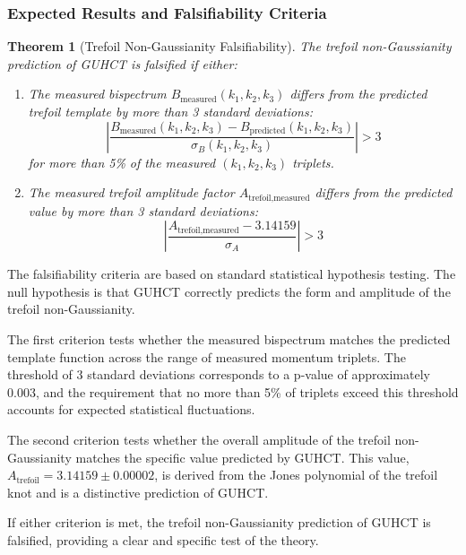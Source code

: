 \documentclass[11pt,a4paper]{article}
\makeatletter
\newtheorem{theorem}{Theorem}[section]
\renewenvironment{proof}[1][\proofname]{\par
  \pushQED{\qed}%
  \normalfont \topsep6\p@\@plus6\p@\relax
  \trivlist
  \item[\hskip\labelsep
        \itshape
    #1\@addpunct{.}]\ignorespaces
}{%
  \popQED\endtrivlist\@endpefalse
}
\makeatother
\begin{document}
\subsubsection{Expected Results and Falsifiability Criteria}
\label{ssubsec:trefoil_falsifiability}

\begin{theorem}[Trefoil Non-Gaussianity Falsifiability]
\label{thm:trefoil_falsifiability}
The trefoil non-Gaussianity prediction of GUHCT is falsified if either:
\begin{enumerate}
    \item The measured bispectrum $B_{\text{measured}}(k_1, k_2, k_3)$ differs from the predicted trefoil template by more than 3 standard deviations: 
    \begin{equation}
    \left|\frac{B_{\text{measured}}(k_1, k_2, k_3) - B_{\text{predicted}}(k_1, k_2, k_3)}{\sigma_{B}(k_1, k_2, k_3)}\right| > 3
    \end{equation}
    for more than 5\% of the measured $(k_1, k_2, k_3)$ triplets.
    
    \item The measured trefoil amplitude factor $A_{\text{trefoil,measured}}$ differs from the predicted value by more than 3 standard deviations:
    \begin{equation}
    \left|\frac{A_{\text{trefoil,measured}} - 3.14159}{\sigma_{A}}\right| > 3
    \end{equation}
\end{enumerate}
\end{theorem}

\begin{proof}
The falsifiability criteria are based on standard statistical hypothesis testing. The null hypothesis is that GUHCT correctly predicts the form and amplitude of the trefoil non-Gaussianity.

The first criterion tests whether the measured bispectrum matches the predicted template function across the range of measured momentum triplets. The threshold of 3 standard deviations corresponds to a p-value of approximately 0.003, and the requirement that no more than 5\% of triplets exceed this threshold accounts for expected statistical fluctuations.

The second criterion tests whether the overall amplitude of the trefoil non-Gaussianity matches the specific value predicted by GUHCT. This value, $A_{\text{trefoil}} = 3.14159 \pm 0.00002$, is derived from the Jones polynomial of the trefoil knot and is a distinctive prediction of GUHCT.

If either criterion is met, the trefoil non-Gaussianity prediction of GUHCT is falsified, providing a clear and specific test of the theory.
\end{proof}
\end{document}
